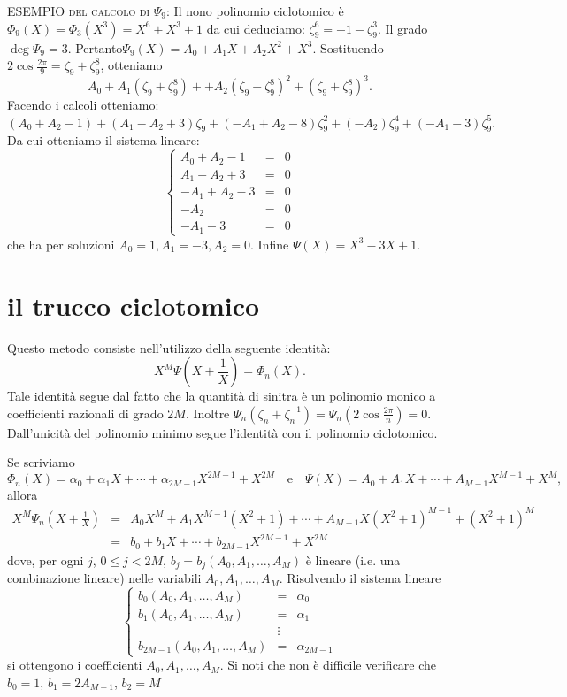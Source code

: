 \documentclass[a4paper,10pt]{article}
\begin{document}
\noindent\textsc{ESEMPIO del calcolo di $\Psi_9$:}
Il nono polinomio ciclotomico è $\Phi_9(X)=\Phi_3(X^3)=X^6+X^3+1$ da cui deduciamo:
$\zeta_9^6=-1-\zeta_9^3.$
Il grado $\deg \Psi_9=3$. Pertanto$\Psi_9(X)=A_0+A_1X+A_2X^2+X^3.$ Sostituendo
$2\cos \frac{2\pi}9=\zeta_9+\zeta_9^8$, otteniamo
$$A_0+A_1\left(\zeta_9+\zeta_9^8\right)+
+A_2\left(\zeta_9+\zeta_9^8\right)^2+\left(\zeta_9+\zeta_9^8\right)^3.$$
Facendo i calcoli otteniamo:
$$\left(A_0+A_2-1\right)+
\left(A_1-A_2+3\right)\zeta_9+
\left(-A_1+A_2-8\right)\zeta_9^2+
\left(-A_2\right)\zeta_9^4+
\left(-A_1-3\right)\zeta_9^5.$$
Da cui otteniamo il sistema lineare:
$$\left\{\begin{array}{rcl}
          A_0+A_2-1& =&0\\
A_1-A_2+3&=&0\\
-A_1+A_2-3&=&0\\
-{A_2}&=&0\\
-A_1-3&=&0
           \end{array}\right.$$
che ha per soluzioni $A_0=1,A_1=-3,A_2=0$. Infine $\Psi(X)=X^3-3X+1.$



\section{il trucco ciclotomico}

Questo metodo consiste nell'utilizzo della seguente identità:
$$X^{M}\Psi\left(X+\frac1X\right)=\Phi_n(X).$$
Tale identità segue dal fatto che la quantità di sinitra è un polinomio monico a coefficienti razionali di grado $2M$.
Inoltre $\Psi_n\left(\zeta_n+\zeta_n^{-1}\right)=\Psi_n\left(2\cos\frac{2\pi}n\right)=0$.
Dall'unicità del polinomio minimo segue l'identità con il polinomio ciclotomico.
\medskip

Se scriviamo
$$\Phi_n(X)=\alpha_0+\alpha_1X+\cdots+\alpha_{2M-1}X^{2M-1}+X^{2M}\quad\textrm{e}\quad \Psi(X)=A_0+A_1X+\cdots+A_{M-1}X^{M-1}+X^{M},$$
allora
\begin{eqnarray*}
 X^{M}\Psi_{n}\left(X+\frac1X\right)&=&
A_0X^M+A_1 X^{M-1}\left(X^2+1\right)+\cdots+A_{M-1}X(X^2+1)^{M-1}+\left(X^2+1\right)^{M}\\
&=&b_0+b_1X+\cdots+b_{2M-1}X^{2M-1}+X^{2M}
\end{eqnarray*}
dove, per ogni $j$, $0\le j<2M$, $b_j=b_j(A_0,A_1,\ldots,A_M)$ è lineare (i.e. una combinazione lineare) nelle variabili
$A_0,A_1,\ldots,A_M$. Risolvendo il sistema lineare
$$\left\{\begin{array}{rcl}
          b_0(A_0,A_1,\ldots,A_M)& =&\alpha_0\\
b_1(A_0,A_1,\ldots,A_M)&=&\alpha_1\\
&\vdots&\\
b_{2M-1}(A_0,A_1,\ldots,A_M)&=&\alpha_{2M-1}
           \end{array}\right.$$
  si ottengono i coefficienti $A_0,A_1,\ldots,A_M$. Si noti che non è difficile verificare che $b_0=1$, $b_1=2A_{M-1}$, $b_2=M$
\medskip
\end{document}
